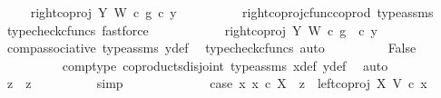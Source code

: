 \begin{isabellebody}
\ \isamarkupfalse%
\ {\isachardoublequoteopen}{\isachardot}{\kern0pt}{\isachardot}{\kern0pt}{\isachardot}{\kern0pt}\ {\isacharequal}{\kern0pt}\ {\isacharparenleft}{\kern0pt}right{\isacharunderscore}{\kern0pt}coproj\ Y\ W\ {\isasymcirc}\isactrlsub c\ g{\isacharparenright}{\kern0pt}\ {\isasymcirc}\isactrlsub c\ y{}{\isachardoublequoteclose}\isanewline
\ \ \ \ \ \ \ \ \isamarkupfalse%
\ right{\isacharunderscore}{\kern0pt}coproj{\isacharunderscore}{\kern0pt}cfunc{\isacharunderscore}{\kern0pt}coprod\ type{\isacharunderscore}{\kern0pt}assms\ \isamarkupfalse%
\ {\isacharparenleft}{\kern0pt}typecheck{\isacharunderscore}{\kern0pt}cfuncs{\isacharcomma}{\kern0pt}\ fastforce{\isacharparenright}{\kern0pt}\isanewline
\ \ \ \ \ \ \isamarkupfalse%
\ \isamarkupfalse%
\ {\isachardoublequoteopen}{\isachardot}{\kern0pt}{\isachardot}{\kern0pt}{\isachardot}{\kern0pt}\ {\isacharequal}{\kern0pt}\ right{\isacharunderscore}{\kern0pt}coproj\ Y\ W\ {\isasymcirc}\isactrlsub c\ g\ \ {\isasymcirc}\isactrlsub c\ y{}{\isachardoublequoteclose}\isanewline
\ \ \ \ \ \ \ \ \isamarkupfalse%
\ comp{\isacharunderscore}{\kern0pt}associative{}\ type{\isacharunderscore}{\kern0pt}assms{\isacharparenleft}{\kern0pt}{}{\isacharparenright}{\kern0pt}\ y{}{\isacharunderscore}{\kern0pt}def\ \isamarkupfalse%
\ {\isacharparenleft}{\kern0pt}typecheck{\isacharunderscore}{\kern0pt}cfuncs{\isacharcomma}{\kern0pt}\ auto{\isacharparenright}{\kern0pt}\isanewline
\ \ \ \ \ \ \isamarkupfalse%
\ \isamarkupfalse%
\ False\isanewline
\ \ \ \ \ \ \ \ \isamarkupfalse%
\ comp{\isacharunderscore}{\kern0pt}type\ coproducts{\isacharunderscore}{\kern0pt}disjoint\ type{\isacharunderscore}{\kern0pt}assms\ x{}{\isacharunderscore}{\kern0pt}def\ y{}{\isacharunderscore}{\kern0pt}def\ \isamarkupfalse%
\ auto\isanewline
\ \ \ \ \ \ \isamarkupfalse%
\ \isamarkupfalse%
\ {\isachardoublequoteopen}z{}\ {\isacharequal}{\kern0pt}\ z{}{\isachardoublequoteclose}\isanewline
\ \ \ \ \ \ \ \ \isamarkupfalse%
\ simp\isanewline
\ \ \ \ \isamarkupfalse%
\isanewline
\ \ \isamarkupfalse%
\isanewline
\ \ \ \ \isamarkupfalse%
\ case{}{\isacharcolon}{\kern0pt}\ {\isachardoublequoteopen}{\isasymnexists}x{}{\isachardot}{\kern0pt}\ x{}\ {\isasymin}\isactrlsub c\ X\ {\isasymand}\ z{}\ {\isacharequal}{\kern0pt}\ left{\isacharunderscore}{\kern0pt}coproj\ X\ V\ {\isasymcirc}\isactrlsub c\ x{}{\isachardoublequoteclose}\isanewline

\end{isabellebody}
